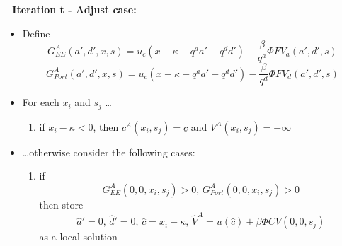 \documentclass{beamer}
\begin{document}
\begin{frame}
  \footnotesize
  - \textbf{Iteration t - Adjust case:}
  \begin{itemize}
    \item Define
    \begin{equation*}
      G^A_{EE}(a',d',x,s)=u_c(x-\kappa - q^aa' - q^dd')- \frac{\beta}{q^a}\Phi FV_a(a',d',s)
    \end{equation*}
    \begin{equation*}
      G^A_{Port}(a',d',x,s)=u_c(x-\kappa - q^aa' - q^dd')- \frac{\beta}{q^d}\Phi FV_d(a',d',s)
    \end{equation*}
    \item For each $x_i$ and $s_j$ \ldots
    \begin{enumerate}
      \footnotesize
      \item if $x_i-\kappa<0$, then $c^A(x_i,s_j)=\underline{c}$ and $V^A(x_i,s_j)=-\infty$
    \end{enumerate}
    \item \ldots otherwise consider the following cases:
    \begin{enumerate}
      \item if
      \begin{equation*}
        G^A_{EE}(0,0,x_i,s_j) > 0\text{, }G^A_{Port}(0,0,x_i,s_j) > 0
      \end{equation*}
      then store
      \begin{equation*}
        \hat{a}'=0\text{, }\hat{d}'=0\text{, }\hat{c} = x_i-\kappa\text{, }\hat{V}^A = u(\hat{c}) + \beta \Phi CV(0,0,s_j)
      \end{equation*}
      as a local solution
    \end{enumerate}
  \end{itemize}
\end{frame}
\end{document}
